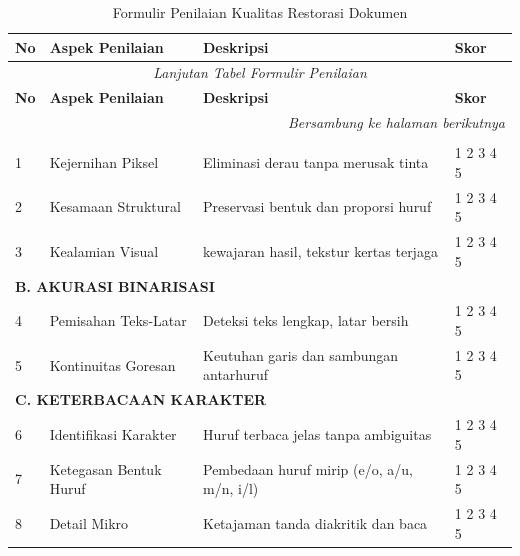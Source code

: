 
\small
\begin{longtable}{|p{0.45cm}|p{3.2cm}|p{6.8cm}|p{1.5cm}|}
\caption{Formulir Penilaian Kualitas Restorasi Dokumen} \\
\hline
\textbf{No} & \textbf{Aspek Penilaian} & \textbf{Deskripsi} & \textbf{Skor} \\
\hline
\endfirsthead

\multicolumn{4}{c}{\textit{Lanjutan Tabel Formulir Penilaian}} \\
\hline
\textbf{No} & \textbf{Aspek Penilaian} & \textbf{Deskripsi} & \textbf{Skor} \\
\hline
\endhead

\hline
\multicolumn{4}{r}{\textit{Bersambung ke halaman berikutnya}} \\
\endfoot

\hline
\endlastfoot


\multicolumn{4}{|l|}{\textbf{A. KUALITAS VISUAL}} \\
\hline
1 & Kejernihan Piksel & Eliminasi derau tanpa merusak tinta & 1 2 3 4 5 \\
\hline
2 & Kesamaan Struktural & Preservasi bentuk dan proporsi huruf & 1 2 3 4 5 \\
\hline
3 & Kealamian Visual & kewajaran hasil, tekstur kertas terjaga & 1 2 3 4 5 \\
\hline

\multicolumn{4}{|l|}{\textbf{B. AKURASI BINARISASI}} \\
\hline
4 & Pemisahan Teks-Latar & Deteksi teks lengkap, latar bersih & 1 2 3 4 5 \\
\hline
5 & Kontinuitas Goresan & Keutuhan garis dan sambungan antarhuruf & 1 2 3 4 5 \\
\hline

\multicolumn{4}{|l|}{\textbf{C. KETERBACAAN KARAKTER}} \\
\hline
6 & Identifikasi Karakter & Huruf terbaca jelas tanpa ambiguitas & 1 2 3 4 5 \\
\hline
7 & Ketegasan Bentuk Huruf & Pembedaan huruf mirip (e/o, a/u, m/n, i/l) & 1 2 3 4 5 \\
\hline
8 & Detail Mikro & Ketajaman tanda diakritik dan baca & 1 2 3 4 5 \\
\hline


\end{longtable}
